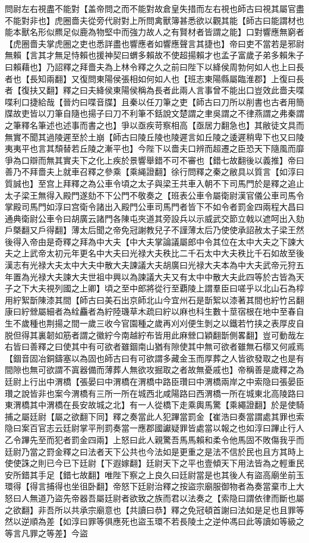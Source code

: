 問尉左右視盡不能對【盖帝問之而不能對故倉皇失措而左右視也師古曰視其屬官盡不能對非也】虎圈嗇夫從旁代尉對上所問禽獸簿甚悉欲以觀其能【師古曰能謂材也能本獸名形似羆足似鹿為物堅中而強力故人之有賢材者皆謂之能】口對響應無窮者【虎圈嗇夫掌虎圈之吏也悉詳盡也響應者如響應聲言其捷也】帝曰吏不當若是邪尉無賴【言其才無足恃賴也援神契曰蝟多賴故不使超揚賴才也孟子富歲子弟多賴朱子曰賴藉也】乃詔釋之拜嗇夫為上林令釋之久之前曰陛下以絳侯周勃何如人也上曰長者也【長知兩翻】又復問東陽侯張相如何如人也【班志東陽縣屬臨淮郡】上復曰長者【復扶又翻】釋之曰夫絳侯東陽侯稱為長者此兩人言事曾不能出口豈效此嗇夫喋喋利口捷給哉【晉灼曰喋音牒】且秦以任刀筆之吏【師古曰刀所以削書也古者用簡牒故吏皆以刀筆自隨也揚子曰刀不利筆不銛說文楚謂之聿吳謂之不律燕謂之弗秦謂之筆釋名筆述也述事而書之也】爭以亟疾苛察相高【亟居力翻急也】其敝徒文具而無實不聞其過陵遲至於土崩【師古曰陵丘陵也陵遲言如丘陵之逶遲稍卑下也又曰陵夷夷平也言其頹替若丘陵之漸平也】今陛下以嗇夫口辨而超遷之臣恐天下隨風而靡爭為口辯而無其實夫下之化上疾於景響舉錯不可不審也【錯七故翻後以義推】帝曰善乃不拜嗇夫上就車召釋之參乘【乘䋲證翻】徐行問釋之秦之敝具以質言【如淳曰質誠也】至宫上拜釋之為公車令頃之太子與梁王共車入朝不下司馬門於是釋之追止太子梁王無得入殿門遂劾不下公門不敬奏之【班表公車令屬衛尉漢官儀公車司馬令掌殿司馬門如淳曰宫衛令諸出入殿門公車司馬門者皆下不如令者罰金四兩程大昌曰通典衛尉公車令曰胡廣云諸門各陳屯夾道其旁設兵以示威武交節立戟以遮呵出入劾戶槩翻又戶得翻】薄太后聞之帝免冠謝教兒子不謹薄太后乃使使承詔赦太子梁王然後得入帝由是奇釋之拜為中大夫【中大夫掌論議屬郎中令其位在太中大夫之下諫大夫之上武帝太初元年更名中大夫曰光禄大夫秩比二千石太中大夫秩比千石如故至後漢志有光禄大夫太中大夫中散大夫諫議大夫胡廣曰光禄大夫本為中大夫武帝元狩五年置為光禄大夫諫大夫世祖中興以為諫議大夫又有太中中散大夫此四等於古皆為天子之下大夫視列國之上卿】頃之至中郎將從行至覇陵上謂羣臣曰嗟乎以北山石為椁用紵絮斮陳漆其間【師古曰美石出京師北山今宜州石是斮絮以漆著其間也紵竹呂翻康曰紵檾屬細者為絟麤者為紵陸璣草木疏曰紵以麻也科生數十莖宿根在地中至春自生不歲種也荆揚之間一歲三收今官園種之歲再刈刈便生剝之以鐵若竹挟之表厚皮自脱但得其裏韌如筋者謂之徽紵今南越紵布皆用此麻檾口穎翻斮側畧翻】豈可動哉左右皆曰善釋之曰使其中有可欲者雖錮南山猶有隙使其中無可欲者雖無石槨又何戚焉【錮音固冶銅鑄塞以為固也師古曰有可欲謂多藏金玉而厚葬之人皆欲發取之也是有間隙也無可欲謂不寘器備而薄葬人無欲攻掘取之者故無憂戚也】帝稱善是歲釋之為廷尉上行出中渭橋【張晏曰中渭橋在渭橋中路臣瓚曰中渭橋兩岸之中索隐曰張晏臣瓚之說皆非也案今渭橋有三所一所在城西北咸陽路曰西渭橋一所在城東北高陵路曰東渭橋其中渭橋在長安故城之北】有一人從橋下走乘輿馬驚【乘繩證翻】於是使騎捕之屬廷尉【屬之欲翻下同】釋之奏當此人犯蹕當罰金【崔浩曰奏當謂處其罪也索隐曰案百官志云廷尉掌平刑罰奏當一應郡國讞疑罪皆處當以報之也如淳曰蹕止行人乙令蹕先至而犯者罰金四兩】上怒曰此人親驚吾馬馬賴和柔令他馬固不敗傷我乎而廷尉乃當之罸金釋之曰法者天下公共也今法如是更重之是法不信於民也且方其時上使使誅之則已今已下廷尉【下遐嫁翻】廷尉天下之平也壹傾天下用法皆為之輕重民安所錯其手足【錯七故翻】唯陛下察之上良久曰廷尉當是也其後人有盜高廟坐前玉環得【得言捕得也坐徂卧翻】帝怒下廷尉治釋之按盜宗廟服御物者為奏當棄市上大怒曰人無道乃盜先帝器吾屬廷尉者欲致之族而君以法奏之【索隐曰謂依律而斷也屬之欲翻】非吾所以共承宗廟意也【共讀曰恭】釋之免冠頓首謝曰法如是足也且罪等然以逆順為差【如淳曰罪等俱應死也盜玉環不若長陵土之逆仲馮曰此等讀如等級之等言凡罪之等差】今盜